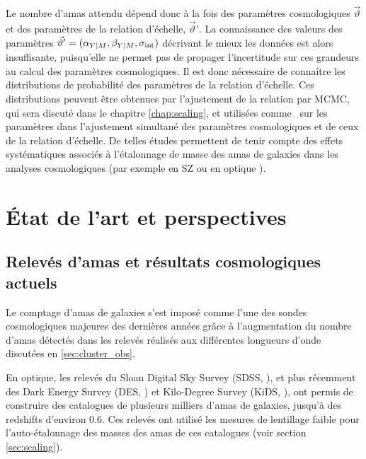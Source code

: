 Le nombre d'amas attendu dépend donc à la fois des paramètres cosmologiques $\vec{\vartheta}$ et des paramètres de la relation d'échelle, $\vec{\vartheta}'$.
La connaissance des valeurs des paramètres $\vec{\vartheta}' = (\alpha_{Y|M}, \beta_{Y|M}, \sigma_{\rm int})$ décrivant le mieux les données est alors insuffisante, puisqu'elle ne permet pas de propager l'incertitude sur ces grandeurs au calcul des paramètres cosmologiques.
Il est donc nécessaire de connaître les distributions de probabilité des paramètres de la relation d'échelle.
Ces distributions peuvent être obtenues par l'ajustement de la relation par MCMC, qui sera discuté dans le chapitre \ref{chap:scaling}, et utilisées comme \prior\ sur les paramètres dans l'ajustement simultané des paramètres cosmologiques et de ceux de la relation d'échelle.
De telles études permettent de tenir compte des effets systématiques associés à l'étalonnage de masse des amas de galaxies dans les analyses cosmologiques (par exemple en SZ \cite{bocquet_cluster_2019} ou en optique \cite{des_collaboration_dark_2020}).

\section{État de l'art et perspectives}

\subsection{Relevés d'amas et résultats cosmologiques actuels}\label{sec:current_surveys}

Le comptage d'amas de galaxies s'est imposé comme l'une des sondes cosmologiques majeures des dernières années grâce à l'augmentation du nombre d'amas détectés dans les relevés réalisés aux différentes longueurs d'onde discutées en \ref{sec:cluster_obs}.

En optique, les relevés du Sloan Digital Sky Survey (SDSS, \cite{rykoff_redmapper_2014,costanzi_methods_2019}), et plus récemment des Dark Energy Survey (DES, \cite{des_collaboration_dark_2020}) et Kilo-Degree Survey (KiDS, \cite{lesci_amico_2020}), ont permis de construire des catalogues de plusieurs milliers d'amas de galaxies, jusqu'à des redshifts d'environ 0.6.
Ces relevés ont utilisé les mesures de lentillage faible pour l'auto-étalonnage des masses des amas de ces catalogues (voir section \ref{sec:scaling}).

